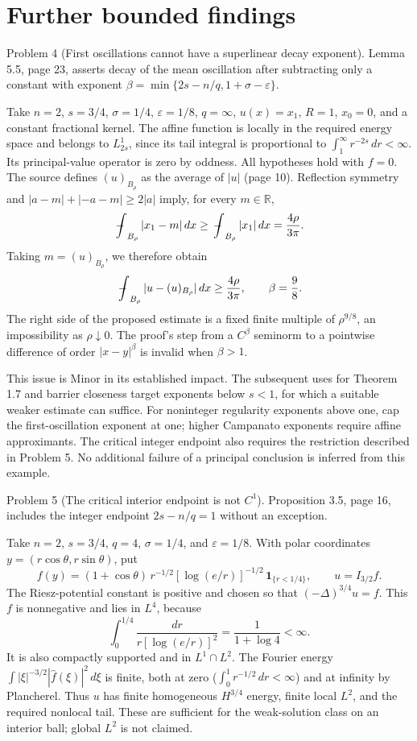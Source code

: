 \documentclass[10pt]{article}
\begin{document}
\section*{Further bounded findings}
Problem 4 (First oscillations cannot have a superlinear decay exponent).  Lemma 5.5, page 23, asserts decay of the mean oscillation after subtracting only a constant with exponent \(\beta=\min\{2s-n/q,1+\sigma-\varepsilon\}\).\par
Take \(n=2\), \(s=3/4\), \(\sigma=1/4\), \(\varepsilon=1/8\), \(q=\infty\), \(u(x)=x_1\), \(R=1\), \(x_0=0\), and a constant fractional kernel. The affine function is locally in the required energy space and belongs to \(L^1_{2s}\), since its tail integral is proportional to \(\int_1^\infty r^{-2s}\,dr<\infty\). Its principal-value operator is zero by oddness. All hypotheses hold with \(f=0\). The source defines \((u)_{B_\rho}\) as the average of \(|u|\) (page 10). Reflection symmetry and \(|a-m|+|-a-m|\ge 2|a|\) imply, for every \(m\in\mathbb R\), \[\mathop{\mathrlap{\mkern 3mu-}\int}\nolimits_{B_\rho}|x_1-m|\,dx
 \ge \mathop{\mathrlap{\mkern 3mu-}\int}\nolimits_{B_\rho}|x_1|\,dx
 =\frac{4\rho}{3\pi}.\] Taking \(m=(u)_{B_\rho}\), we therefore obtain \[\mathop{\mathrlap{\mkern 3mu-}\int}\nolimits_{B_\rho}|u-(u)_{B_\rho}|\,dx
 \ge \frac{4\rho}{3\pi},
 \qquad \beta=\frac98.\] The right side of the proposed estimate is a fixed finite multiple of \(\rho^{9/8}\), an impossibility as \(\rho\downarrow0\). The proof’s step from a \(C^\beta\) seminorm to a pointwise difference of order \(|x-y|^\beta\) is invalid when \(\beta>1\).\par
This issue is Minor in its established impact. The subsequent uses for Theorem 1.7 and barrier closeness target exponents below \(s<1\), for which a suitable weaker estimate can suffice. For noninteger regularity exponents above one, cap the first-oscillation exponent at one; higher Campanato exponents require affine approximants. The critical integer endpoint also requires the restriction described in Problem 5. No additional failure of a principal conclusion is inferred from this example.\par
Problem 5 (The critical interior endpoint is not \(C^1\)).  Proposition 3.5, page 16, includes the integer endpoint \(2s-n/q=1\) without an exception.\par
Take \(n=2\), \(s=3/4\), \(q=4\), \(\sigma=1/4\), and \(\varepsilon=1/8\). With polar coordinates \(y=(r\cos\theta,r\sin\theta)\), put \[f(y)=(1+\cos\theta)\,r^{-1/2}
              [\log(e/r)]^{-1/2}\,\mathbf1_{\{r<1/4\}},
 \qquad u=I_{3/2}f .\] The Riesz-potential constant is positive and chosen so that \((-\Delta)^{3/4}u=f\). This \(f\) is nonnegative and lies in \(L^4\), because \[\int_0^{1/4}\frac{dr}{r[\log(e/r)]^2}
       =\frac1{1+\log4}<\infty .\] It is also compactly supported and in \(L^1\cap L^2\). The Fourier energy \(\int|\xi|^{-3/2}|\widehat f(\xi)|^2\,d\xi\) is finite, both at zero (\(\int_0^1r^{-1/2}\,dr<\infty\)) and at infinity by Plancherel. Thus \(u\) has finite homogeneous \(H^{3/4}\) energy, finite local \(L^2\), and the required nonlocal tail. These are sufficient for the weak-solution class on an interior ball; global \(L^2\) is not claimed.\par
\end{document}

